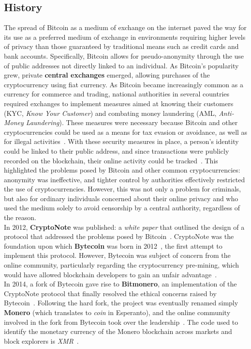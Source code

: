 \documentclass[conference]{IEEEtran}
\begin{document}
\subsection{History}
The spread of Bitcoin as a medium of exchange on the internet paved the way for its use as a preferred medium of exchange in environments requiring higher levels of privacy than those guaranteed by traditional means such as credit cards and bank accounts. Specifically, Bitcoin allows for pseudo-anonymity through the use of public addresses not directly linked to an individual. As Bitcoin's popularity grew, private \textbf{central exchanges} emerged, allowing purchases of the cryptocurrency using fiat currency. As Bitcoin became increasingly common as a currency for commerce and trading, national authorities in several countries required exchanges to implement measures aimed at knowing their customers (KYC, \textit{Know Your Customer}) and combating money laundering (AML, \textit{Anti-Money Laundering}). These measures were necessary because Bitcoin and other cryptocurrencies could be used as a means for tax evasion or avoidance, as well as for illegal activities~\cite{crypto_money_laundering}. With these security measures in place, a person's identity could be linked to their public address, and since transactions were publicly recorded on the blockchain, their online activity could be tracked~\cite{bitcoin_auditable}. This highlighted the problems posed by Bitcoin and other common cryptocurrencies: anonymity was ineffective, and tighter control by authorities effectively restricted the use of cryptocurrencies. However, this was not only a problem for criminals, but also for ordinary individuals concerned about their online privacy and who used the medium solely to avoid censorship by a central authority, regardless of the reason.\\
In 2012, \textbf{CryptoNote} was published: a \textit{white paper} that outlined the design of a protocol that addressed the problems posed by Bitcoin~\cite{cryptonote}. CryptoNote was the foundation upon which \textbf{Bytecoin} was born in 2012~\cite{bytecoin}, the first attempt to implement this protocol. However, Bytecoin was subject of concern from the online community, particularly regarding the cryptocurrency pre-mining, which would have allowed blockchain developers to gain an unfair advantage~\cite{mastering_monero}.\\
In 2014, a fork of Bytecoin gave rise to \textbf{Bitmonero}, an implementation of the CryptoNote protocol that finally resolved the ethical concerns raised by Bytecoin~\cite{mastering_monero}. Following the hard fork, the project was eventually renamed simply \textbf{Monero} (which translates to \textit{coin} in Esperanto), and the online community involved in the fork from Bytecoin took over the leadership~\cite{monero_brief_history}. The code used to identify the monetary currency of the Monero blockchain across markets and block explorers is \textit{XMR}~\cite{coinmarketcap_monero}.
\end{document}
